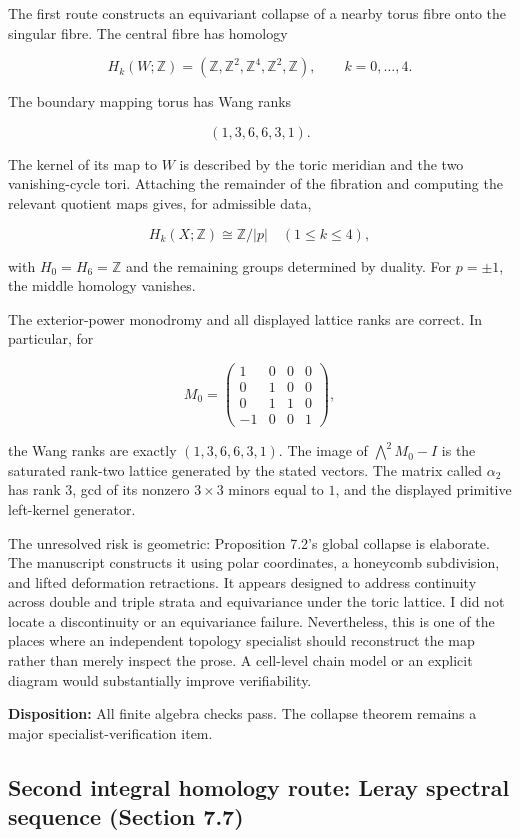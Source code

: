\documentclass[
  10pt,
  letterpaper,
]{article}
\newcommand{\Z}{\mathbb Z}
\begin{document}
The first route constructs an equivariant collapse of a nearby torus
fibre onto the singular fibre. The central fibre has homology

\[
H_k(W;\Z)=(\Z,\Z^2,\Z^4,\Z^2,\Z),
\qquad k=0,\ldots,4.
\]

The boundary mapping torus has Wang ranks

\[
(1,3,6,6,3,1).
\]

The kernel of its map to \(W\) is described by the toric meridian and
the two vanishing-cycle tori. Attaching the remainder of the fibration
and computing the relevant quotient maps gives, for admissible data,

\[
H_k(X;\Z)\cong\Z/|p|\quad (1\le k\le4),
\]

with \(H_0=H_6=\Z\) and the remaining groups determined by duality. For
\(p=\pm1\), the middle homology vanishes.

The exterior-power monodromy and all displayed lattice ranks are
correct. In particular, for

\[
M_0=\begin{pmatrix}
1&0&0&0\\0&1&0&0\\0&1&1&0\\-1&0&0&1
\end{pmatrix},
\]

the Wang ranks are exactly \((1,3,6,6,3,1)\). The image of
\(\bigwedge^2M_0-I\) is the saturated rank-two lattice generated by the
stated vectors. The matrix called \(\alpha_2\) has rank \(3\), gcd of
its nonzero \(3\times3\) minors equal to \(1\), and the displayed
primitive left-kernel generator.

The unresolved risk is geometric: Proposition 7.2's global collapse is
elaborate. The manuscript constructs it using polar coordinates, a
honeycomb subdivision, and lifted deformation retractions. It appears
designed to address continuity across double and triple strata and
equivariance under the toric lattice. I did not locate a discontinuity
or an equivariance failure. Nevertheless, this is one of the places
where an independent topology specialist should reconstruct the map
rather than merely inspect the prose. A cell-level chain model or an
explicit diagram would substantially improve verifiability.

\textbf{Disposition:} All finite algebra checks pass. The collapse
theorem remains a major specialist-verification item.

\subsection{Second integral homology route: Leray spectral sequence
(Section
7.7)}\label{second-integral-homology-route-leray-spectral-sequence-section-7.7}
\end{document}
